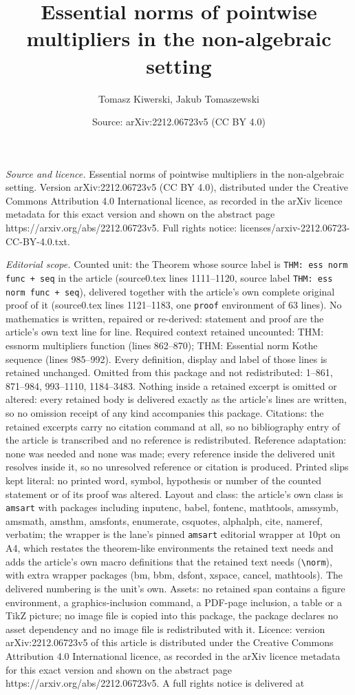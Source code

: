 \documentclass[10pt,a4paper]{amsart}
\title[Essential norms of pointwise multipliers in the non-algebrai]{Essential norms of pointwise multipliers in the non-algebraic setting}
\author{Tomasz Kiwerski, Jakub Tomaszewski}
\date{Source: arXiv:2212.06723v5 (CC BY 4.0)}
\begin{document}
\maketitle

\noindent\emph{Source and licence.} Essential norms of pointwise multipliers in the non-algebraic setting. Version arXiv:2212.06723v5 (CC BY 4.0), distributed under the Creative Commons Attribution 4.0 International licence, as recorded in the arXiv licence metadata for this exact version and shown on the abstract page https://arxiv.org/abs/2212.06723v5. Full rights notice: licenses/arxiv-2212.06723-CC-BY-4.0.txt.\par\smallskip

\noindent\textit{Editorial scope.} Counted unit: the Theorem whose source label is \texttt{THM: ess norm func + seq} in the article (source0.tex lines 1111--1120, source label \texttt{THM: ess norm func + seq}), delivered together with the article's own complete original proof of it (source0.tex lines 1121--1183, one \texttt{proof} environment of 63 lines). No mathematics is written, repaired or re-derived: statement and proof are the article's own text line for line. Required context retained uncounted: THM: essnorm multipliers function (lines 862--870); THM: Essential norm Kothe sequence (lines 985--992). Every definition, display and label of those lines is retained unchanged. Omitted from this package and not redistributed: 1--861, 871--984, 993--1110, 1184--3483. Nothing inside a retained excerpt is omitted or altered: every retained body is delivered exactly as the article's lines are written, so no omission receipt of any kind accompanies this package. Citations: the retained excerpts carry no citation command at all, so no bibliography entry of the article is transcribed and no reference is redistributed. Reference adaptation: none was needed and none was made; every reference inside the delivered unit resolves inside it, so no unresolved reference or citation is produced. Printed slips kept literal: no printed word, symbol, hypothesis or number of the counted statement or of its proof was altered. Layout and class: the article's own class is \texttt{amsart} with packages including inputenc, babel, fontenc, mathtools, amssymb, amsmath, amsthm, amsfonts, enumerate, csquotes, alphalph, cite, nameref, verbatim; the wrapper is the lane's pinned \texttt{amsart} editorial wrapper at 10pt on A4, which restates the theorem-like environments the retained text needs and adds the article's own macro definitions that the retained text needs (\texttt{\textbackslash norm}), with extra wrapper packages (bm, bbm, dsfont, xspace, cancel, mathtools). The delivered numbering is the unit's own. Assets: no retained span contains a figure environment, a graphics-inclusion command, a PDF-page inclusion, a table or a TikZ picture; no image file is copied into this package, the package declares no asset dependency and no image file is redistributed with it. Licence: version arXiv:2212.06723v5 of this article is distributed under the Creative Commons Attribution 4.0 International licence, as recorded in the arXiv licence metadata for this exact version and shown on the abstract page https://arxiv.org/abs/2212.06723v5. A full rights notice is delivered at 
\end{document}
